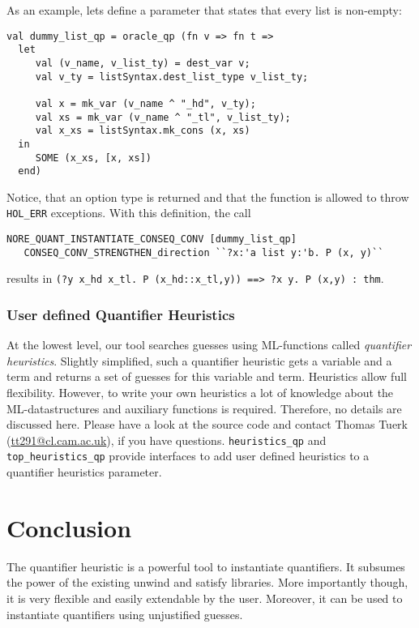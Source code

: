 \documentclass[a4paper,12pt,DIV=12,oneside]{scrbook}
\theoremstyle{definition}
\theoremstyle{remark}
\begin{document}
As an example, lets define a parameter that states that every list is non-empty:
{\scriptsize
\begin{verbatim}
val dummy_list_qp = oracle_qp (fn v => fn t =>
  let
     val (v_name, v_list_ty) = dest_var v;
     val v_ty = listSyntax.dest_list_type v_list_ty;

     val x = mk_var (v_name ^ "_hd", v_ty);
     val xs = mk_var (v_name ^ "_tl", v_list_ty);
     val x_xs = listSyntax.mk_cons (x, xs)
  in
     SOME (x_xs, [x, xs])
  end)
\end{verbatim}}

\noindent
Notice, that an option type is returned and that the function is
allowed to throw \texttt{HOL\_ERR} exceptions.
With this definition, the call
\begin{verbatim}
NORE_QUANT_INSTANTIATE_CONSEQ_CONV [dummy_list_qp]
   CONSEQ_CONV_STRENGTHEN_direction ``?x:'a list y:'b. P (x, y)``
\end{verbatim}
results in
\verb+(?y x_hd x_tl. P (x_hd::x_tl,y)) ==> ?x y. P (x,y) : thm+.

\subsection{User defined Quantifier Heuristics}\label{subsec_user_defined_quantheu}

At the lowest level, our tool searches guesses using ML-functions
called \emph{quantifier heuristics}. Slightly simplified, such a
quantifier heuristic gets a variable and a term and returns a set of
guesses for this variable and term. Heuristics allow full
flexibility. However, to write your own heuristics a lot of knowledge
about the ML-datastructures and auxiliary functions is
required. Therefore, no details are discussed here. Please have a look
at the source code and contact Thomas Tuerk
(\url{tt291@cl.cam.ac.uk}), if you have questions.
\texttt{heuristics\_qp} and \texttt{top\_heuristics\_qp} provide
interfaces to add user defined heuristics to a quantifier heuristics
parameter.


\chapter{Conclusion}\label{sec_conclusion}

The quantifier heuristic is a powerful tool to instantiate quantifiers.
It subsumes the power of the existing unwind and satisfy libraries. More importantly though,
it is very flexible and easily extendable by the user. Moreover,
it can be used to instantiate quantifiers using unjustified guesses.



\end{document}

